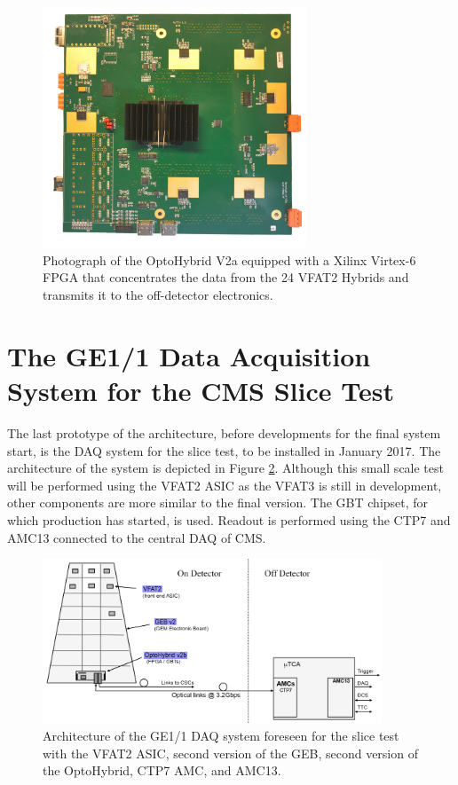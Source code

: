       \begin{figure}[t!]
        \centering
        \includegraphics[width=0.7\textwidth]{img/II-2-daq/oh-v2a.jpg}
        \caption{Photograph of the OptoHybrid V2a equipped with a Xilinx Virtex-6 FPGA that concentrates the data from the 24 VFAT2 Hybrids and transmits it to the off-detector electronics.}
        \label{fig:II-2-ohv2a}
      \end{figure}

  \section{The GE1/1 Data Acquisition System for the CMS Slice Test}

    The last prototype of the architecture, before developments for the final system start, is the DAQ system for the slice test, to be installed in January 2017. The architecture of the system is depicted in Figure \ref{fig:II-2-gem-system-v2b}. Although this small scale test will be performed using the VFAT2 ASIC as the VFAT3 is still in development, other components are more similar to the final version. The GBT chipset, for which production has started, is used. Readout is performed using the CTP7 and AMC13 connected to the central DAQ of CMS.

    \begin{figure}[b!]
      \centering
      \includegraphics[width=0.9\textwidth]{img/II-2-daq/gem-system-v2b.pdf}
      \caption{Architecture of the GE1/1 DAQ system foreseen for the slice test with the VFAT2 ASIC, second version of the GEB, second version of the OptoHybrid, CTP7 AMC, and AMC13.}
      \label{fig:II-2-gem-system-v2b}
    \end{figure}

